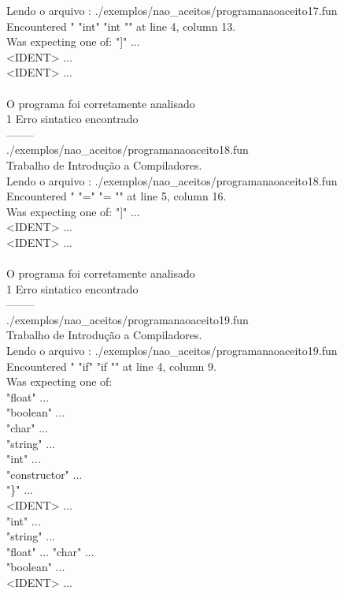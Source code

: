 \documentclass[
	article,			%
	11pt,				%
	oneside,			%
	a4paper,			%
	portuguese,			%
	brazil,				%
	sumario=tradicional
	]{abntex2}
\begin{document}
Lendo o arquivo : ./exemplos/nao\_aceitos/programanaoaceito17.fun\\
Encountered " "int" "int "" at line 4, column 13.\\
Was expecting one of:
    "]" ...\\
    <IDENT> ...\\
    <IDENT> ...\\
\\
O programa foi corretamente analisado\\
1 Erro sintatico encontrado\\
--------\\
./exemplos/nao\_aceitos/programanaoaceito18.fun\\
Trabalho de Introdução a Compiladores.\\
Lendo o arquivo : ./exemplos/nao\_aceitos/programanaoaceito18.fun\\
Encountered " "=" "= "" at line 5, column 16.\\
Was expecting one of:
    "]" ...\\
    <IDENT> ...\\
    <IDENT> ...\\
\\
O programa foi corretamente analisado\\
1 Erro sintatico encontrado\\
--------\\
./exemplos/nao\_aceitos/programanaoaceito19.fun\\
Trabalho de Introdução a Compiladores.\\
Lendo o arquivo : ./exemplos/nao\_aceitos/programanaoaceito19.fun\\
Encountered " "if" "if "" at line 4, column 9.\\
Was expecting one of:\\
    "float" ...\\
    "boolean" ...\\
    "char" ...\\
    "string" ...\\
    "int" ...\\
    "constructor" ...\\
    "\}" ...\\
    <IDENT> ...\\
    "int" ...\\
    "string" ...\\
    "float" ...
    "char" ...\\
    "boolean" ...\\
    <IDENT> ...\\
\end{document}
